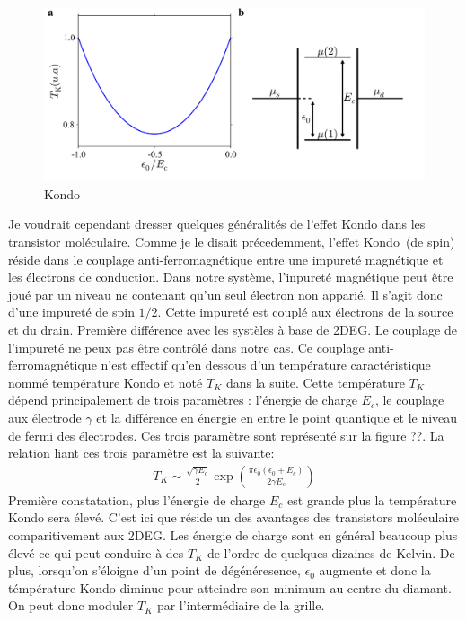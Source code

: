 \begin{figure}
\includegraphics[scale=0.5]{Theorie/Transport/figure6/figure6.pdf} 
\caption{Kondo}
\label{Kondo_param}
\end{figure}


Je voudrait cependant dresser quelques généralités de l'effet Kondo dans les transistor moléculaire. Comme je le disait précedemment, l'effet Kondo~(de spin) réside dans le couplage anti-ferromagnétique entre une impureté magnétique et les électrons de conduction. Dans notre système, l'inpureté magnétique peut être joué par un niveau ne contenant qu'un seul électron non apparié. Il s'agit donc d'une impureté de spin $1/2$. Cette impureté est couplé aux électrons de la source et du drain. Première différence avec les systèles à base de 2DEG. Le couplage de l'impureté ne peux pas être contrôlé dans notre cas. Ce couplage anti-ferromagnétique n'est effectif qu'en dessous d'un température caractéristique nommé température Kondo et noté $T_K$ dans la suite. Cette température $T_K$ dépend principalement de trois paramètres : l'énergie de charge $E_c$, le couplage aux électrode $\gamma$ et la différence en énergie en entre le point quantique et le niveau de fermi des électrodes. Ces trois paramètre sont représenté sur la figure ??. La relation liant ces trois paramètre est la suivante:
\begin{eqnarray}
T_K \sim \frac{\sqrt{\gamma E_c}}{2} \exp(\frac{\pi \epsilon_0(\epsilon_0 + E_c)}{2\gamma E_c})
\end{eqnarray}
Première constatation, plus l'énergie de charge $E_c$ est grande plus la température Kondo sera élevé. C'est ici que réside un des avantages des transistors moléculaire comparitivement aux 2DEG. Les énergie de charge sont en général beaucoup plus élevé ce qui peut conduire à des $T_K$ de l'ordre de quelques dizaines de Kelvin. De plus, lorsqu'on s'éloigne d'un point de dégénéresence, $\epsilon_0$ augmente et donc la témpérature Kondo diminue pour atteindre son minimum au centre du diamant. On peut donc moduler $T_K$ par l'intermédiaire de la grille.